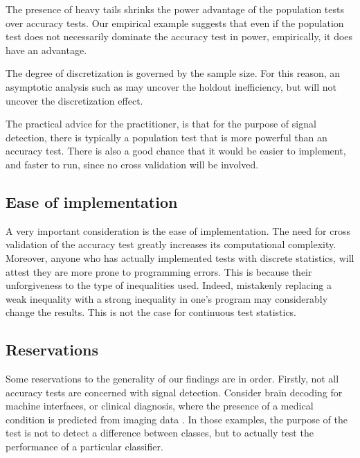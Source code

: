 \documentclass[12pt,a4paper]{article}
\theoremstyle{definition}
\begin{document}
The presence of heavy tails shrinks the power advantage of the population tests over accuracy tests. 
Our empirical example suggests that even if the population test does not necessarily dominate the accuracy test in power, empirically, it does have an advantage. 


The degree of discretization is governed by the sample size. 
For this reason, an asymptotic analysis such as \cite{ramdas_classification_2016} may uncover the holdout inefficiency, but will not uncover the discretization effect. 

The practical advice for the practitioner, is that for the purpose of signal detection, there is typically a population test that is more powerful than an accuracy test. 
There is also a good chance that it would be easier to implement, and faster to run, since no cross validation will be involved. 



\subsection{Ease of implementation}
A very important consideration is the ease of implementation. 
The need for cross validation of the accuracy test greatly increases its computational complexity. 
Moreover, anyone who has actually implemented tests with discrete statistics, will attest they are more prone to programming errors. 
This is because their unforgiveness to the type of inequalities used. 
Indeed, mistakenly replacing a weak inequality with a strong inequality in one's program may considerably change the results. 
This is not the case for continuous test statistics. 




\subsection{Reservations}
\label{sec:reservations}

Some reservations to the generality of our findings are in order. 
Firstly, not all accuracy tests are concerned with signal detection.
Consider brain decoding for machine interfaces, or clinical diagnosis, where the presence of a medical condition is predicted from imaging data \citep[e.g.][]{olivetti_induction_2012,wager_fmri-based_2013}. 
In those examples, the purpose of the test is not to detect a difference between classes, but to actually test the performance of a particular classifier.  
\end{document}

